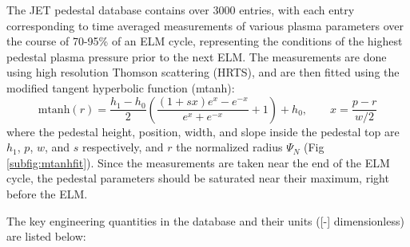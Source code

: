 \documentclass[a4paper, twoside, final, 12pt]{article}
\begin{document}
The JET pedestal database contains over 3000 entries, with each entry corresponding to time averaged measurements of various plasma parameters over the course of 70-95\% of an ELM cycle, representing the conditions of the highest pedestal plasma pressure prior to the next ELM.
The measurements are done using high resolution Thomson scattering (HRTS)\cite{Pasqualotto_2004}, and are then fitted using the modified tangent hyperbolic function (mtanh): 
\begin{equation} \label{eq:mtanh}
\text{mtanh}(r) = \frac{h_1 - h_0}{2} \left( \frac{(1 + sx) e^x - e^{-x}}{e^x + e^{-x}} + 1\right) + h_0 , \quad \quad x=\frac{p-r}{w/2}
\end{equation}
where the pedestal height, position, width, and slope inside the pedestal top are $h_1$, $p$, $w$, and $s$ respectively, and $r$ the normalized radius $\Psi_N$ (Fig \ref{subfig:mtanhfit}). 
Since the measurements are taken near the end of the ELM cycle, the pedestal parameters should be saturated near their maximum, right before the ELM.

The key engineering quantities in the database and their units ([-] dimensionless) are listed below:
\end{document}
